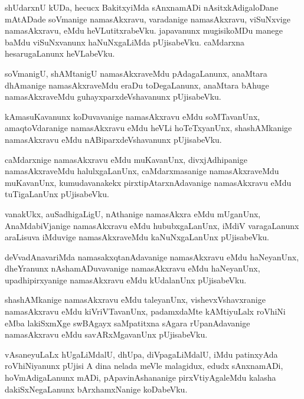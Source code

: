 \documentclass{article}
\begin{document}
\begin{mn}
shUdarxnU  kUDa,  hecucx  BakitxyiMda  sAnxnamADi  nAsitxkAdigaloDane  mAtADade  soVmanige  namasAkxravu,  
varadanige  namasAkxravu,  viSuNxvige  namasAkxravu,  eMdu  heVLutitxrabeVku.  japavanunx  mugisikoMDu  
manege  baMdu  viSuNxvanunx  haNuNxgaLiMda  pUjisabeVku.  caMdarxna  hesarugaLanunx  heVLabeVku.
\end{mn}

\begin{mn}
soVmanigU,  shAMtanigU  namasAkxraveMdu  pAdagaLanunx,  anaMtara  dhAmanige  namasAkxraveMdu  eraDu  
toDegaLanunx,  anaMtara  bAhuge  namasAkxraveMdu  guhayxparxdeVshavanunx  pUjisabeVku.
\end{mn}

\begin{mn}
kAmasuKavanunx  koDuvavanige  namasAkxravu  eMdu  soMTavanUnx,  amaqtoVdaranige  namasAkxravu  
eMdu  heVLi  hoTeTxyanUnx,  shashAMkanige  namasAkxravu  eMdu  nABiparxdeVshavanunx  pUjisabeVku.
\end{mn}

\begin{mn}
caMdarxnige  namasAkxravu  eMdu  muKavanUnx,  divxjAdhipanige  namasAkxraveMdu  halulxgaLanUnx,  
caMdarxmasanige  namasAkxraveMdu  muKavanUnx,  kumudavanakekx  pirxtipAtarxnAdavanige  
namasAkxravu  eMdu  tuTigaLanUnx  pUjisabeVku.
\end{mn}

\begin{mn}
vanakUkx,  auSadhigaLigU,  nAthanige  namasAkxra  eMdu  mUganUnx,  AnaMdabiVjanige  namasAkxravu  eMdu  
hububxgaLanUnx,  iMdiV  varagaLanunx  araLisuva  iMduvige  namasAkxraveMdu  kaNuNxgaLanUnx  pUjisabeVku.
\end{mn}

\begin{mn}
deVvadAnavariMda  namasakxqtanAdavanige  namasAkxravu  eMdu  haNeyanUnx,  dheYranunx  nAshamADuvavanige  
namasAkxravu  eMdu  haNeyanUnx,  upadhipirxyanige  namasAkxravu  eMdu  kUdalanUnx  pUjisabeVku.
\end{mn}

\begin{mn}
shashAMkanige  namasAkxravu  eMdu  taleyanUnx,  vishevxVshavxranige  namasAkxravu  eMdu  kiVriVTavanUnx,  
padamxdaMte  kAMtiyuLalx  roVhiNi  eMba  lakiSxmXge  swBAgayx saMpatitxna  sAgara rUpanAdavanige  
namasAkxravu  eMdu  savARxMgavanUnx  pUjisabeVku.
\end{mn}

\begin{mn}
vAsaneyuLaLx  hUgaLiMdalU,  dhUpa,  diVpagaLiMdalU,  iMdu  patinxyAda  roVhiNiyanunx  pUjisi  A  dina  
nelada  meVle  malagidux,  edudx sAnxnamADi,  hoVmAdigaLanunx  mADi,  pApavinAshananige  pirxVtiyAgaleMdu  
kalasha  dakiSxNegaLanunx  bArxhamxNanige  koDabeVku.
\end{mn}
\end{document}
